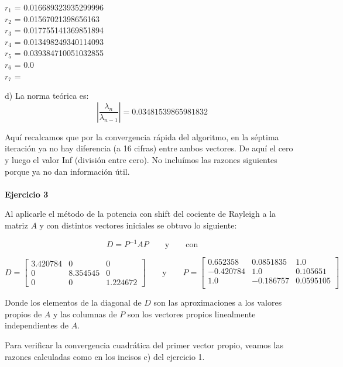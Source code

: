 \documentclass[11pt]{article}
\begin{document}
\begin{multicols}{3}
\noindent
$ r_{1} $ = 0.016689323935299996 \\
$ r_{2} $ = 0.01567021398656163 \\
$ r_{3} $ = 0.017755141369851894 \\
$ r_{4} $ = 0.013498249340114093 \\
$ r_{5} $ = 0.039384710051032855 \\
$ r_{6} $ = 0.0 \\
$ r_{7} $ =  \\
\end{multicols}



d) La norma teórica es:
$$
\left| \frac{\lambda_n}{\lambda_{n-1}} \right| = 0.03481539865981832
$$

Aquí recalcamos que por la convergencia rápida del algoritmo, en la séptima
iteración ya no hay diferencia (a 16 cifras) entre ambos vectores. De aquí el
cero y luego el valor Inf (división entre cero). No incluímos las razones
siguientes porque ya no dan información útil.
\noindent
\\
\\

\newpage
\noindent
\textbf{Ejercicio 3}

\noindent
Al aplicarle el método de la potencia con shift del cociente de Rayleigh a la matriz $A$ y con distintos vectores iniciales se obtuvo lo siguiente:

\[
 D = P^{-1}AP
 \qquad\text{y}\qquad
\text{con}
 \]

\[
 D =
 \begin{bmatrix}
 3.420784 & 0 & 0 \\
 0 & 8.354545 & 0 \\
 0 & 0 & 1.224672
\end{bmatrix}
 \qquad\text{y}\qquad
P =
 \begin{bmatrix}
  0.652358 &  0.0851835 & 1.0      \\
 -0.420784  & 1.0    &    0.105651 \\
  1.0     &  -0.186757 &  0.0595105 \\
\end{bmatrix}
 \]

Donde los elementos de la diagonal de $D$ son las aproximaciones a los valores propios de $A$ y las columnas de $P$ son los vectores propios linealmente independientes de $A$.

Para verificar la convergencia cuadrática del primer vector propio, veamos las razones calculadas como en los incisos c) del ejercicio 1.
\end{document}
